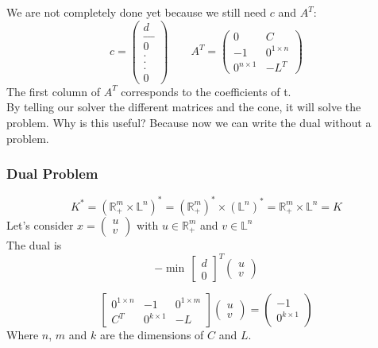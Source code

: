 We are not completely done yet because we still need $c$ and $A^T$:\\
$$c = \begin{pmatrix}
d\\
\_ \_ \_ \\
0\\
. \\
. \\
. \\
0
\end{pmatrix} \qquad A^T= \begin{pmatrix}
0 & C\\
-1 & 0^{1\times n}\\
0^{n\times 1} & -L^T
\end{pmatrix}
$$
The first column of $A^T$ corresponds to the coefficients of t. \\

By telling our solver the different matrices and the cone, it will solve the problem. Why is this useful? Because now we can write the dual without a problem.

\subsubsection{Dual Problem}
$$K^*= (\mathbb{R}^m_+ \times \mathbb{L}^n)^*= (\mathbb{R}^m_+)^* \times (\mathbb{L}^n)^*= \mathbb{R}^m_+ \times \mathbb{L}^n = K$$
Let's consider $x= \begin{pmatrix}
u \\
v
\end{pmatrix} $ with $u \in \mathbb{R}^m_+$ and $v \in \mathbb{L}^n$\\
The dual is 
$$-\min \, \begin{bmatrix}
d \\
0
\end{bmatrix}^T \begin{pmatrix}
u\\
v
\end{pmatrix} $$

\begin{equation}
\begin{bmatrix}
0^{1\times n} & -1 & 0^{1\times m}\\
C^T & 0^{k\times 1} & -L
\end{bmatrix}\begin{pmatrix}
u\\
v
\end{pmatrix}=
\begin{pmatrix}
-1\\
0^{k\times 1}
\end{pmatrix}
\end{equation}
Where $n$, $m$ and $k$ are the dimensions of $C$ and $L$.
 

